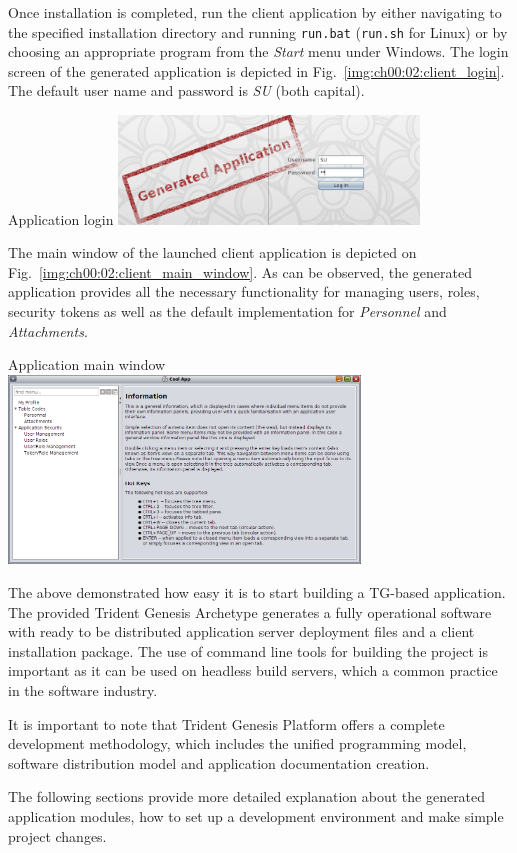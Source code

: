   Once installation is completed, run the client application by either navigating to the specified installation directory and running \texttt{run.bat} (\texttt{run.sh} for Linux) or by choosing an appropriate program from the \emph{Start} menu under Windows.
  The login screen of the generated application is depicted in Fig.~\ref{img:ch00:02:client_login}.
  The default user name and password is \emph{SU} (both capital).

  \begin{image}{Application login}{\label{img:ch00:02:client_login}}    
    \includegraphics[width=0.6\textwidth]{parts/00-part/chapters/01-application-modules/images/04-client-login.png}
  \end{image}

  The main window of the launched client application is depicted on Fig.~\ref{img:ch00:02:client_main_window}.
  As can be observed, the generated application provides all the necessary functionality for managing users, roles, security tokens as well as the default implementation for \emph{Personnel} and \emph{Attachments}.

  \begin{image}{Application main window}{\label{img:ch00:02:client_main_window}}    
    \includegraphics[width=0.7\textwidth]{parts/00-part/chapters/01-application-modules/images/05-client-main-window.png}
  \end{image}

  The above demonstrated how easy it is to start building a TG-based application.
  The provided Trident Genesis Archetype generates a fully operational software with ready to be distributed application server deployment files and a client installation package.
  The use of command line tools for building the project is important as it can be used on headless build servers, which a common practice in the software industry.

  It is important to note that Trident Genesis Platform offers a complete development methodology, which includes the unified programming model, software distribution model and application documentation creation.
  
  The following sections provide more detailed explanation about the generated application modules, how to set up a development environment and make simple project changes.